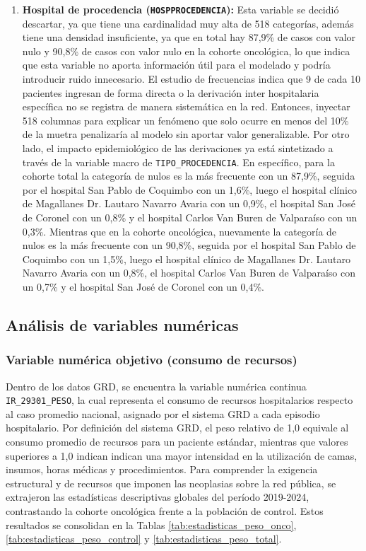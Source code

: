 \begin{enumerate}
    \item \textbf{Hospital de procedencia (\texttt{HOSPPROCEDENCIA}):} Esta variable se decidió descartar, ya que tiene una cardinalidad muy alta de 518 categorías, además tiene una densidad insuficiente, ya que en total hay 87,9\% de casos con valor nulo y 90,8\% de casos con valor nulo en la cohorte oncológica, lo que indica que esta variable no aporta información útil para el modelado y podría introducir ruido innecesario. El estudio de frecuencias indica que 9 de cada 10 pacientes ingresan de forma directa o la derivación inter hospitalaria específica no se registra de manera sistemática en la red. Entonces, inyectar 518 columnas para explicar un fenómeno que solo ocurre en menos del 10\% de la muetra penalizaría al modelo sin aportar valor generalizable. Por otro lado, el impacto epidemiológico de las derivaciones ya está sintetizado a través de la variable macro de \texttt{TIPO\_PROCEDENCIA}. En específico, para la cohorte total la categoría de nulos es la más frecuente con un 87,9\%, seguida por el hospital San Pablo de Coquimbo con un 1,6\%, luego el hospital clínico de Magallanes Dr. Lautaro Navarro Avaria con un 0,9\%, el hospital San José de Coronel con un 0,8\% y el hospital Carlos Van Buren de Valparaíso con un 0,3\%. Mientras que en la cohorte oncológica, nuevamente la categoría de nulos es la más frecuente con un 90,8\%, seguida por el hospital San Pablo de Coquimbo con un 1,5\%, luego el hospital clínico de Magallanes Dr. Lautaro Navarro Avaria con un 0,8\%, el hospital Carlos Van Buren de Valparaíso con un 0,7\% y el hospital San José de Coronel con un 0,4\%.


\end{enumerate}

\subsection{Análisis de variables numéricas}

\subsubsection{Variable numérica objetivo (consumo de recursos)}

Dentro de los datos GRD, se encuentra la variable numérica continua \texttt{IR\_29301\_PESO}, la cual representa el consumo de recursos hospitalarios respecto al caso promedio nacional, asignado por el sistema GRD a cada episodio hospitalario. Por definición del sistema GRD, el peso relativo de 1,0 equivale al consumo promedio de recursos para un paciente estándar, mientras que valores superiores a 1,0 indican indican una mayor intensidad en la utilización de camas, insumos, horas médicas y procedimientos. Para comprender la exigencia estructural y de recursos que imponen las neoplasias sobre la red pública, se extrajeron las estadísticas descriptivas globales del período 2019-2024, contrastando la cohorte oncológica frente a la población de control. Estos resultados se consolidan en la Tablas \ref{tab:estadisticas_peso_onco}, \ref{tab:estadisticas_peso_control} y \ref{tab:estadisticas_peso_total}.

